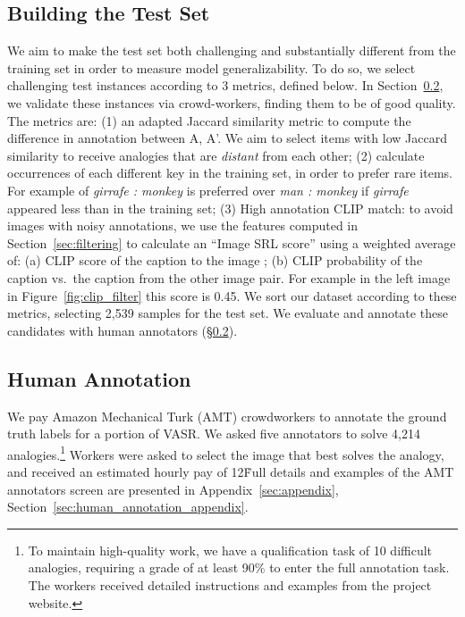 \documentclass[letterpaper]{article} \usepackage{aaai23}  \usepackage{times}  \usepackage{helvet}  \usepackage{courier}  \usepackage[hyphens]{url}  \usepackage{graphicx} \urlstyle{rm} \def\UrlFont{\rm}  \usepackage{natbib}  \usepackage{caption} \frenchspacing  \setlength{\pdfpagewidth}{8.5in}  \setlength{\pdfpageheight}{11in}  \usepackage{algorithm}
\begin{document}
\subsection{Building the Test Set}
\label{sec:candidates_gold}
We aim to make the test set both challenging and substantially different from the training set in order to measure model generalizability. To do so, we select challenging test instances according to 3 metrics, defined below. In Section~\ref{sec:mturk}, we validate these instances via crowd-workers, finding them to be of good quality.
The metrics are: (1) an adapted Jaccard similarity metric to compute the difference in annotation between A, A'. We aim to select items with low Jaccard similarity to receive analogies that are \emph{distant} from each other; (2) calculate occurrences of each different key in the training set, in order to prefer rare items. For example  of \textit{girrafe : monkey} is preferred over \textit{man : monkey} if \textit{girrafe} appeared less than  in the training set; (3) High annotation CLIP match: to avoid images with noisy annotations, we use the features computed in Section~\ref{sec:filtering} to calculate an ``Image SRL score'' using a weighted average of: (a) CLIP score of the caption to the image ; (b) CLIP probability of the caption vs.~the caption from the other image pair. For example in the left image in Figure~\ref{fig:clip_filter} this score is 0.45. 
We sort our dataset according to these metrics, selecting 2,539 samples for the test set. We evaluate and annotate these candidates with human annotators (\S\ref{sec:mturk}).

\subsection{Human Annotation}
\label{sec:mturk}
We pay Amazon Mechanical Turk (AMT) crowdworkers to annotate the ground truth labels for a portion of VASR. We asked five annotators to solve 4,214 analogies.\footnote{To maintain high-quality work, we have a qualification task of 10 difficult analogies, requiring a grade of at least 90\% to enter the full annotation task. The workers received detailed instructions and examples from the project website.} Workers were asked to select the image that best solves the analogy, and received an estimated hourly pay of 12\. Full details and examples of the AMT annotators screen are presented in Appendix~\ref{sec:appendix}, Section~\ref{sec:human_annotation_appendix}.
\end{document}
